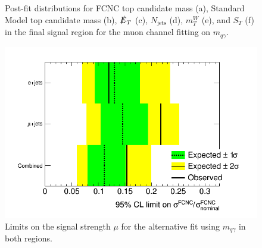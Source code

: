 \begin{figure}[]
\hfil  
{}
\caption{Post-fit distributions for FCNC top candidate mass (a), Standard Model top candidate mass (b), $\slashed{E}_T$ (c), $N_\text{jets}$ (d),  $m_T^W$ (e), and $S_T$ (f) in the final signal region for the muon channel fitting on  $m_{q\gamma}$.}
\end{figure}

\begin{figure}[ht!]
	\centering
	\includegraphics[width=0.5\columnwidth]{../ThesisImages/RegionPlots/FinalRegions/Systematics/LimitPlot.png}
	\caption{Limits on the signal strength $\mu$ for the alternative fit using $m_{q\gamma}$ in both regions.
	}
\end{figure}

